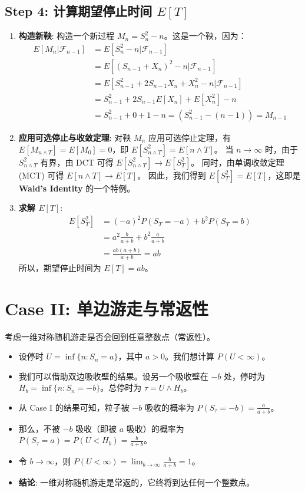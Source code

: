 \documentclass[12pt, a4paper, oneside, fontset=windows]{ctexbook}
\begin{document}
\subsection{Step 4: 计算期望停止时间 $E[T]$}
\begin{enumerate}
    \item \textbf{构造新鞅}: 构造一个新过程 $M_n = S_n^2 - n$。这是一个鞅，因为：
    \begin{align*}
        E[M_n|\mathcal{F}_{n-1}] &= E[S_n^2 - n | \mathcal{F}_{n-1}] \\
        &= E[(S_{n-1}+X_n)^2 - n | \mathcal{F}_{n-1}] \\
        &= E[S_{n-1}^2 + 2S_{n-1}X_n + X_n^2 - n | \mathcal{F}_{n-1}] \\
        &= S_{n-1}^2 + 2S_{n-1}E[X_n] + E[X_n^2] - n \\
        &= S_{n-1}^2 + 0 + 1 - n = (S_{n-1}^2 - (n-1)) = M_{n-1}
    \end{align*}
    \item \textbf{应用可选停止与收敛定理}: 对鞅 $M_n$ 应用可选停止定理，有 $E[M_{n \wedge T}] = E[M_0] = 0$，即 $E[S_{n \wedge T}^2] = E[n \wedge T]$。
    当 $n \to \infty$ 时，由于 $S_{n \wedge T}^2$ 有界，由 DCT 可得 $E[S_{n \wedge T}^2] \to E[S_T^2]$。
    同时，由单调收敛定理 (MCT) 可得 $E[n \wedge T] \to E[T]$。
    因此，我们得到 $E[S_T^2] = E[T]$，这即是 \textbf{Wald's Identity} 的一个特例。
    \item \textbf{求解 $E[T]$}:
    \begin{align*}
        E[S_T^2] &= (-a)^2 P(S_T=-a) + b^2 P(S_T=b) \\
        &= a^2 \frac{b}{a+b} + b^2 \frac{a}{a+b} \\
        &= \frac{ab(a+b)}{a+b} = ab
    \end{align*}
    所以，期望停止时间为 $E[T] = ab$。
\end{enumerate}

\section{Case II: 单边游走与常返性}
考虑一维对称随机游走是否会回到任意整数点（常返性）。
\begin{itemize}
    \item 设停时 $U = \inf\{n: S_n = a\}$，其中 $a>0$。我们想计算 $P(U < \infty)$。
    \item 我们可以借助双边吸收壁的结果。设另一个吸收壁在 $-b$ 处，停时为 $H_b = \inf\{n: S_n = -b\}$。总停时为 $\tau = U \wedge H_b$。
    \item 从 Case I 的结果可知，粒子被 $-b$ 吸收的概率为 $P(S_\tau = -b) = \frac{a}{a+b}$。
    \item 那么，不被 $-b$ 吸收（即被 $a$ 吸收）的概率为 $P(S_\tau = a) = P(U < H_b) = \frac{b}{a+b}$。
    \item 令 $b \to \infty$，则 $P(U < \infty) = \lim_{b \to \infty} \frac{b}{a+b} = 1$。
    \item \textbf{结论}: 一维对称随机游走是常返的，它终将到达任何一个整数点。
\end{itemize}
\end{document}
